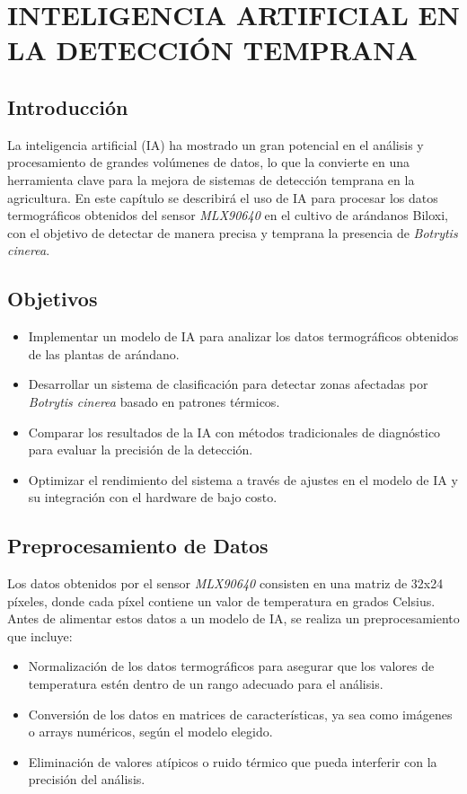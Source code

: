 \chapter{INTELIGENCIA ARTIFICIAL EN LA DETECCIÓN TEMPRANA}

\section{Introducción}
La inteligencia artificial (IA) ha mostrado un gran potencial en el análisis y procesamiento de grandes volúmenes de datos, lo que la convierte en una herramienta clave para la mejora de sistemas de detección temprana en la agricultura. En este capítulo se describirá el uso de IA para procesar los datos termográficos obtenidos del sensor \textit{MLX90640} en el cultivo de arándanos Biloxi, con el objetivo de detectar de manera precisa y temprana la presencia de \textit{Botrytis cinerea}.

\section{Objetivos}
\begin{itemize}
    \item Implementar un modelo de IA para analizar los datos termográficos obtenidos de las plantas de arándano.
    \item Desarrollar un sistema de clasificación para detectar zonas afectadas por \textit{Botrytis cinerea} basado en patrones térmicos.
    \item Comparar los resultados de la IA con métodos tradicionales de diagnóstico para evaluar la precisión de la detección.
    \item Optimizar el rendimiento del sistema a través de ajustes en el modelo de IA y su integración con el hardware de bajo costo.
\end{itemize}

\section{Preprocesamiento de Datos}
Los datos obtenidos por el sensor \textit{MLX90640} consisten en una matriz de 32x24 píxeles, donde cada píxel contiene un valor de temperatura en grados Celsius. Antes de alimentar estos datos a un modelo de IA, se realiza un preprocesamiento que incluye:
\begin{itemize}
    \item Normalización de los datos termográficos para asegurar que los valores de temperatura estén dentro de un rango adecuado para el análisis.
    \item Conversión de los datos en matrices de características, ya sea como imágenes o arrays numéricos, según el modelo elegido.
    \item Eliminación de valores atípicos o ruido térmico que pueda interferir con la precisión del análisis.
\end{itemize}

